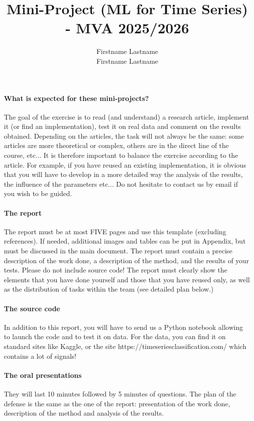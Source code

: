 \documentclass[11pt]{article}
\title{Mini-Project (ML for Time Series) - MVA 2025/2026}
\author{
Firstname Lastname \email{youremail1@mail.com} \\ %
Firstname Lastname \email{youremail2@mail.com} %
}
\begin{document}
\maketitle

\paragraph{What is expected for these mini-projects?}
The goal of the exercise is to read (and understand) a research article, implement it (or find an implementation), test it on real data and comment on the results obtained.
Depending on the articles, the task will not always be the same: some articles are more theoretical or complex, others are in the direct line of the course, etc... It is therefore important to balance the exercise according to the article. For example, if you have reused an existing implementation, it is obvious that you will have to develop in a more detailed way the analysis of the results, the influence of the parameters etc... Do not hesitate to contact us by email if you wish to be guided.

\paragraph{The report}
 The report must be at most FIVE pages and use this template (excluding references). If needed, additional images and tables can be put in Appendix, but must be discussed in the main document. The report must contain a precise description of the work done, a description of the method, and the results of your tests. Please do not include source code! The report must clearly show the elements that you have done yourself and those that you have reused only, as well as the distribution of tasks within the team (see detailed plan below.)
 
 \paragraph{The source code}
In addition to this report, you will have to send us a Python notebook allowing to launch the code and to test it on data. For the data, you can find it on standard sites like Kaggle, or the site https://timeseriesclassification.com/ which contains a lot of signals!


\paragraph{The oral presentations}
They will last 10 minutes followed by 5 minutes of questions. The plan of the defense is the same as the one of the report: presentation of the work done, description of the method and analysis of the results.
\end{document}
